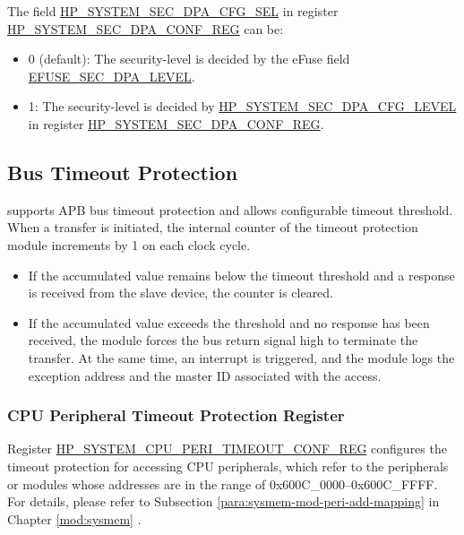 \documentclass[main\_\_EN.tex]{subfiles}
\begin{document}
The field \hyperref[fielddesc:HPSYSTEMSECDPALEVEL]{HP\_SYSTEM\_SEC\_DPA\_CFG\_SEL} in register \hyperref[regdesc:HPSYSTEMSECDPACONFREG]{HP\_SYSTEM\_SEC\_DPA\_CONF\_REG} can be:
\begin{itemize}
    \item 0 (default): The security-level is decided by the eFuse field \hyperref[fielddesc:EFUSESECDPALEVEL]{EFUSE\_SEC\_DPA\_LEVEL}.
    \item 1: The security-level is decided by \hyperref[fielddesc:HPSYSTEMSECDPALEVEL]{HP\_SYSTEM\_SEC\_DPA\_CFG\_LEVEL} in register \hyperref[regdesc:HPSYSTEMSECDPACONFREG]{HP\_SYSTEM\_SEC\_DPA\_CONF\_REG}.
\end{itemize}


\subsection{Bus Timeout Protection}

\chipname{} supports APB bus timeout protection and allows configurable timeout threshold. When a transfer is initiated, the internal counter of the timeout protection module increments by 1 on each clock cycle.
\begin{itemize}
    \item If the accumulated value remains below the timeout threshold and a response is received from the slave device, the counter is cleared.
    \item If the accumulated value exceeds the threshold and no response has been received, the module forces the bus return signal high to terminate the transfer. At the same time, an interrupt is triggered, and the module logs the exception address and the master ID associated with the access.
\end{itemize}


\subsubsection{CPU Peripheral Timeout Protection Register}

Register \hyperref[regdesc:HPSYSTEMCPUPERITIMEOUTCONFREG]{HP\_SYSTEM\_CPU\_PERI\_TIMEOUT\_CONF\_REG} configures the timeout protection for accessing CPU peripherals, which refer to the peripherals or modules whose addresses are in the range of 0x600C\_0000–0x600C\_FFFF. For details, please refer to Subsection \ref{para:sysmem-mod-peri-add-mapping} \textit{} in Chapter \ref{mod:sysmem} \textit{}.
\end{document}
